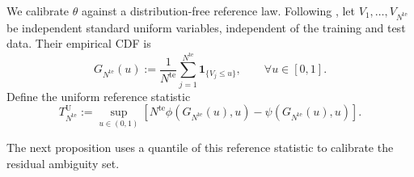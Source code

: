 \documentclass[review,11pt,3p,authoryear,nopreprintline]{elsarticle}
\begin{document}
We calibrate $\theta$ against a distribution-free reference law. Following \citet{L.J23}, let $V_1,\ldots,V_{N^{\mathrm{te}}}$ be independent standard uniform variables, independent of the training and test data. Their empirical CDF is
\begin{equation}
  G_{N^{\mathrm{te}}}(u):=\frac{1}{N^{\mathrm{te}}}\sum_{j=1}^{N^{\mathrm{te}}}\mathbf 1_{\{V_j\le u\}},\qquad \forall u\in[0,1].
  \label{eq-dw-reference-cdf}
\end{equation}
Define the uniform reference statistic
\begin{equation}
  T_{N^{\mathrm{te}}}^{\mathrm U}:=\sup_{u\in(0,1)}\left[N^{\mathrm{te}}\phi\!\left(G_{N^{\mathrm{te}}}(u),u\right)-\psi\!\left(G_{N^{\mathrm{te}}}(u),u\right)\right].
  \label{eq-dw-reference-statistic}
\end{equation}

The next proposition uses a quantile of this reference statistic to calibrate the residual ambiguity set.
\end{document}
